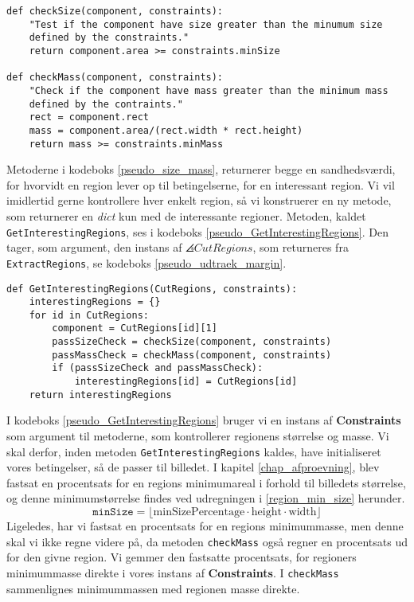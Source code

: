 {\begin{lstlisting}[caption={Metoder til at konstollere en regions
    størrelse og masse.},captionpos=b,label={pseudo_size_mass},
    frame=tb, breaklines=false, float]
def checkSize(component, constraints):
    "Test if the component have size greater than the minumum size
    defined by the constraints."
    return component.area >= constraints.minSize

def checkMass(component, constraints):
    "Check if the component have mass greater than the minimum mass
    defined by the contraints."
    rect = component.rect
    mass = component.area/(rect.width * rect.height)
    return mass >= constraints.minMass
\end{lstlisting}

Metoderne i kodeboks \ref{pseudo_size_mass}, returnerer begge en
sandhedsværdi, for hvorvidt en region lever op til betingelserne, for en
interessant region. Vi vil imidlertid gerne kontrollere hver enkelt
region, så vi konstruerer en ny metode, som returnerer en \emph{dict}
kun med de interessante regioner.  Metoden, kaldet
\texttt{GetInterestingRegions}, ses i kodeboks
\ref{pseudo_GetInterestingRegions}. Den tager, som argument, den instans
af $\angles{CutRegions}$, som returneres fra \texttt{ExtractRegions}, se
kodeboks \ref{pseudo_udtraek_margin}.

\begin{lstlisting}[caption={Metode som returnerer kun de insteressante
    regioner, givet en instans af $\angles{CutRegions}$}, captionpos=b,
    label={pseudo_GetInterestingRegions}, frame=tb, breaklines=false,
    float]
def GetInterestingRegions(CutRegions, constraints):
    interestingRegions = {}
    for id in CutRegions:
        component = CutRegions[id][1]
        passSizeCheck = checkSize(component, constraints)
        passMassCheck = checkMass(component, constraints)
        if (passSizeCheck and passMassCheck):
            interestingRegions[id] = CutRegions[id]
    return interestingRegions
\end{lstlisting}

I kodeboks \ref{pseudo_GetInterestingRegions} bruger vi en instans af
\textbf{Constraints} som argument til metoderne, som kontrollerer
regionens størrelse og masse. Vi skal derfor, inden metoden
\texttt{GetInterestingRegions} kaldes, have initialiseret vores
betingelser, så de passer til billedet. I kapitel
\ref{chap_afproevning}, blev fastsat en procentsats for en regions
minimumareal i forhold til billedets størrelse, og denne
minimumstørrelse findes ved udregningen i \eqref{region_min_size}
herunder.
\begin{equation}
    \mathtt{minSize} =
    \lfloor
    \mathrm{minSizePercentage}\cdot\mathrm{height}\cdot\mathrm{width}
    \rfloor
    \label{region_min_size}
\end{equation}
Ligeledes, har vi fastsat en procentsats for en regions minimummasse, men denne
skal vi ikke regne videre på, da metoden \texttt{checkMass} også regner
en procentsats ud for den givne region. Vi gemmer den fastsatte
procentsats, for regioners minimummasse direkte i vores instans af
\textbf{Constraints}. I \texttt{checkMass} sammenlignes minimummassen
med regionen masse direkte.

}
